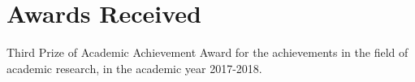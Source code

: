 \documentclass[master]{thesis-uestc}
\begin{document}
\section*{\textbf{Awards Received}}
Third Prize of Academic Achievement Award for the achievements in the field of academic research, in the academic year 2017-2018.





\end{document}
